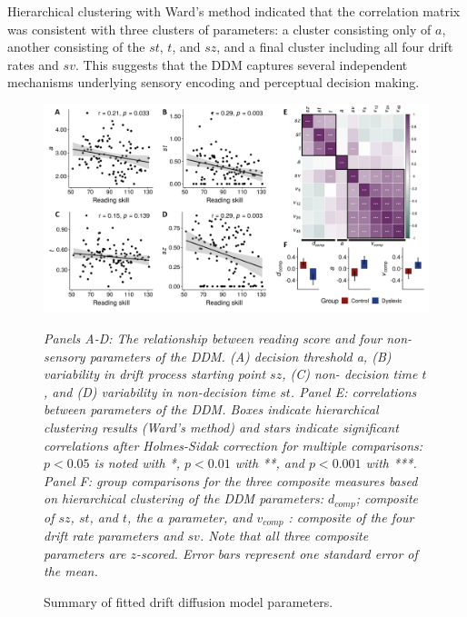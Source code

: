 \documentclass[../uwthesis.tex]{subfiles}
\begin{document}
Hierarchical clustering with Ward’s method\citep{Ward1963HierarchicalFunction} indicated that the correlation matrix was consistent with three clusters of parameters: a cluster consisting only of $a$, another consisting of
the $st$, $t$, and $sz$, and a final cluster including all four drift rates and $sv$. This suggests that the
DDM captures several independent mechanisms underlying sensory encoding and perceptual decision making.

\begin{figure}
    \centering
    \caption{Summary of fitted drift diffusion model parameters.}
    \label{fig:p3_fig4}
    \includegraphics[width=18cm]{images/paper_3/4_decision_parameters_modified.png}
    \item \textit{Panels A-D: The relationship between reading score and four non-sensory parameters
of the DDM. (A) decision threshold a, (B) variability in drift process starting point $sz$, (C) non-
decision time $t$, and (D) variability in non-decision time $st$. Panel E: correlations between
parameters of the DDM. Boxes indicate hierarchical clustering results (Ward’s method) and stars
indicate significant correlations after Holmes-Sidak correction for multiple comparisons: $p < 0.05$ is noted with *, $p < 0.01$ with **, and $p < 0.001$ with ***. Panel F: group comparisons for the
three composite measures based on hierarchical clustering of the DDM parameters: $d_{comp}$;
composite of $sz$, $st$, and $t$, the $a$ parameter, and $v_{comp}$ : composite of the four drift rate parameters
and $sv$. Note that all three composite parameters are $z$-scored. Error bars represent one standard
error of the mean.}

\end{figure}
\end{document}

